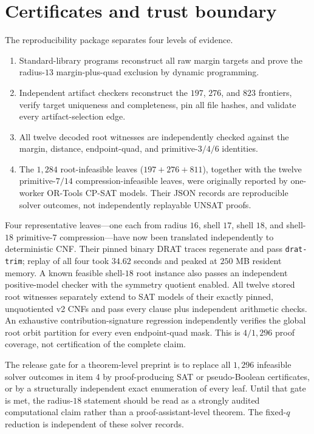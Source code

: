 \documentclass[11pt]{article}
\begin{document}
\section{Certificates and trust boundary}\label{sec:certification}

The reproducibility package separates four levels of evidence.
\begin{enumerate}
\item Standard-library programs reconstruct all raw margin targets and prove
the radius-$13$ margin-plus-quad exclusion by dynamic programming.
\item Independent artifact checkers reconstruct the $197$, $276$, and $823$
frontiers, verify target uniqueness and completeness, pin all file hashes,
and validate every artifact-selection edge.
\item All twelve decoded root witnesses are independently checked against the
margin, distance, endpoint-quad, and primitive-$3/4/6$ identities.
\item The $1{,}284$ root-infeasible leaves ($197+276+811$), together with the
twelve primitive-$7/14$ compression-infeasible leaves, were originally
reported by one-worker OR-Tools CP-SAT models.  Their JSON records are
reproducible solver outcomes, not independently replayable UNSAT proofs.
\end{enumerate}

Four representative leaves---one each from radius $16$, shell $17$, shell
$18$, and shell-$18$ primitive-$7$ compression---have now been translated
independently to deterministic CNF.  Their pinned binary DRAT traces
regenerate and pass \texttt{drat-trim}; replay of all four took $34.62$
seconds and peaked at $250$ MB resident memory.  A known feasible shell-$18$
root instance also passes an independent positive-model checker with the
symmetry quotient enabled.  All twelve stored root witnesses separately
extend to SAT models of their exactly pinned, unquotiented v2 CNFs and pass
every clause plus independent arithmetic checks.  An exhaustive
contribution-signature regression independently verifies the global root
orbit partition for every even endpoint-quad mask.  This is $4/1{,}296$
proof coverage, not certification of the complete claim.

The release gate for a theorem-level preprint is to replace all $1{,}296$
infeasible solver outcomes in item 4 by
proof-producing SAT or pseudo-Boolean certificates, or by a structurally
independent exact enumeration of every leaf.  Until that gate is met, the
radius-$18$ statement should be read as a strongly audited computational
claim rather than a proof-assistant-level theorem.  The fixed-$q$ reduction
is independent of these solver records.
\end{document}

